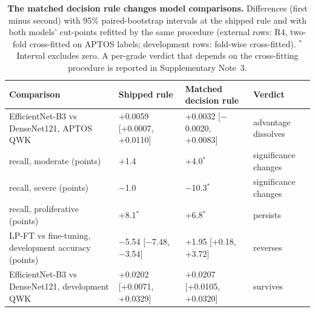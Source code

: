 \begin{table}[t]
\caption{\textbf{The matched decision rule changes model comparisons.} Differences (first minus
second) with 95\% paired-bootstrap intervals at the shipped rule and with both models'
cut-points refitted by the same procedure (external rows: R4, two-fold cross-fitted on
APTOS labels; development rows: fold-wise cross-fitted). $^\ast$Interval excludes zero.
A per-grade verdict that depends on the cross-fitting procedure is reported in Supplementary
Note~3.}\label{tab:record}
\centering\scriptsize\setlength{\tabcolsep}{3pt}
\begin{tabular}{@{}p{4.0cm}p{2.7cm}p{2.7cm}l@{}}
\toprule
Comparison & Shipped rule & Matched decision rule & Verdict \\
\midrule
EfficientNet-B3 vs DenseNet121, APTOS QWK & +0.0059 [+0.0007, +0.0110] & +0.0032 [$-$0.0020, +0.0083] & advantage dissolves \\
\quad recall, moderate (points) & +1.4 & +4.0$^\ast$ & significance changes \\
\quad recall, severe (points) & $-$1.0 & $-$10.3$^\ast$ & significance changes \\
\quad recall, proliferative (points) & +8.1$^\ast$ & +6.8$^\ast$ & persists \\
LP-FT vs fine-tuning, development accuracy (points) & $-$5.54 [$-$7.48, $-$3.54] & +1.95 [+0.18, +3.72] & reverses \\
EfficientNet-B3 vs DenseNet121, development QWK & +0.0202 [+0.0071, +0.0329] & +0.0207 [+0.0105, +0.0320] & survives \\
\bottomrule
\end{tabular}
\end{table}
